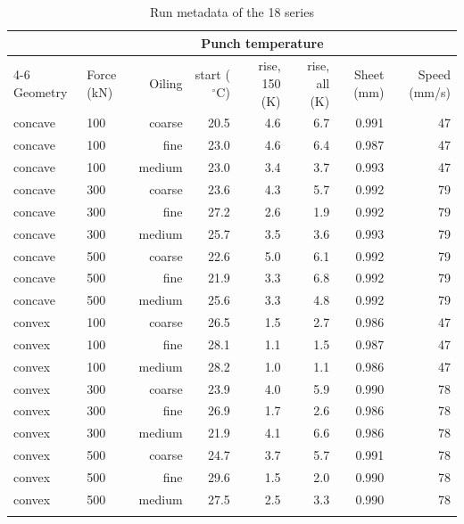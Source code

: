 \documentclass[pdflatex,sn-basic]{sn-jnl}
\newcommand{\tabsize}{\fontsize{8}{9.5}\selectfont}
\begin{document}
\begin{table}[tbp]
\tabsize
\setlength{\tabcolsep}{2.8pt}
\caption{Run metadata of the 18 series}\label{tab:runs}
\begin{tabular}{@{}llrrrrrr@{}}
\toprule
 & & & \multicolumn{3}{c}{Punch temperature} & & \\
\cmidrule(lr){4-6}
Geometry & Force (kN) & Oiling & start ($^\circ$C) & rise, 150 (K) & rise, all (K) & Sheet (mm) & Speed (mm/s) \\
\midrule
concave & 100 & coarse & 20.5 & 4.6 & 6.7 & 0.991 & 47 \\
concave & 100 & fine & 23.0 & 4.6 & 6.4 & 0.987 & 47 \\
concave & 100 & medium & 23.0 & 3.4 & 3.7 & 0.993 & 47 \\
concave & 300 & coarse & 23.6 & 4.3 & 5.7 & 0.992 & 79 \\
concave & 300 & fine & 27.2 & 2.6 & 1.9 & 0.992 & 79 \\
concave & 300 & medium & 25.7 & 3.5 & 3.6 & 0.993 & 79 \\
concave & 500 & coarse & 22.6 & 5.0 & 6.1 & 0.992 & 79 \\
concave & 500 & fine & 21.9 & 3.3 & 6.8 & 0.992 & 79 \\
concave & 500 & medium & 25.6 & 3.3 & 4.8 & 0.992 & 79 \\
convex & 100 & coarse & 26.5 & 1.5 & 2.7 & 0.986 & 47 \\
convex & 100 & fine & 28.1 & 1.1 & 1.5 & 0.987 & 47 \\
convex & 100 & medium & 28.2 & 1.0 & 1.1 & 0.986 & 47 \\
convex & 300 & coarse & 23.9 & 4.0 & 5.9 & 0.990 & 78 \\
convex & 300 & fine & 26.9 & 1.7 & 2.6 & 0.986 & 78 \\
convex & 300 & medium & 21.9 & 4.1 & 6.6 & 0.986 & 78 \\
convex & 500 & coarse & 24.7 & 3.7 & 5.7 & 0.991 & 78 \\
convex & 500 & fine & 29.6 & 1.5 & 2.0 & 0.990 & 78 \\
convex & 500 & medium & 27.5 & 2.5 & 3.3 & 0.990 & 78 \\
\botrule
\end{tabular}
\end{table}
\end{document}

